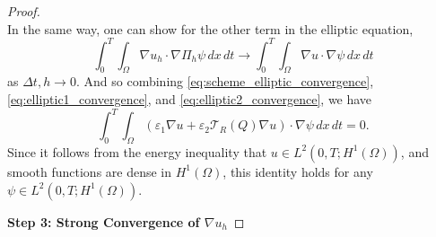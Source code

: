 \documentclass[10pt,letterpaper]{amsart}
\newcommand{\dom}{\Omega}
\newcommand{\T}{\mathcal T}
\theoremstyle{definition}{\newtheorem{definition}[lemma]{Definition}}
\theoremstyle{note}{\newtheorem{claim}{Claim}[section]
\newtheorem*{claim*}{Claim}}
\numberwithin{equation}{section}
\begin{document}
\begin{proof}
\begin{equation}
\end{equation}
In the same way, one can show for the other term in the elliptic equation,
\begin{equation}
\label{eq:elliptic1_convergence}
    \int_0^T \int_\Omega\nabla u_h\cdot\nabla\Pi_h\psi\, dx\, dt \longrightarrow \int_0^T\int_\Omega \nabla u\cdot \nabla\psi\, dx\, dt
\end{equation}
as $\Delta t,h\to 0$.
And so combining \eqref{eq:scheme_elliptic_convergence}, \eqref{eq:elliptic1_convergence}, and \eqref{eq:elliptic2_convergence}, we have
\begin{equation}
\label{eq:scheme_elliptic_convergence_limit}
    \int_0^T\int_\Omega (\varepsilon_1\nabla u + \varepsilon_2 \T_R(Q)\nabla u)\cdot\nabla\psi\, dx\, dt = 0.
\end{equation}
Since it follows from the energy inequality that $u\in L^2(0,T;H^1(\dom))$, and smooth functions are dense in $H^1(\Omega)$, this identity holds for any $\psi\in L^2(0,T;H^1(\dom))$.




\medskip

\textbf{Step 3: Strong Convergence of $\nabla u_h$}


\end{proof}
\end{document}
